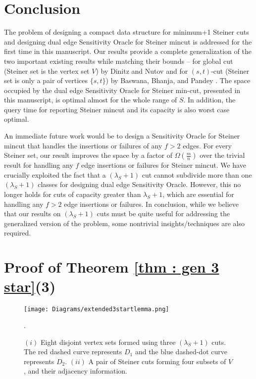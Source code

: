 \documentclass[letterpaper,11pt]{article}
\begin{document}
\section{Conclusion} \label{sec : conclusion}
The problem of designing a compact data structure for minimum+1 Steiner cuts and designing dual edge Sensitivity Oracle for Steiner mincut is addressed for the first time in this manuscript. Our results provide a complete generalization of the two important existing results while matching their bounds -- for global cut (Steiner set is the vertex set $V$) by Dinitz and Nutov \cite{DBLP:conf/stoc/DinitzN95} and for $(s,t)$-cut (Steiner set is only a pair of vertices $\{s,t\}$) by Baswana, Bhanja, and Pandey \cite{DBLP:journals/talg/BaswanaBP23}. The space occupied by the dual edge Sensitivity Oracle for Steiner min-cut, presented in this manuscript, is optimal almost for the whole range of $S$. In addition, the query time for reporting Steiner mincut and its capacity is also worst case optimal.

An immediate future work would be to design a Sensitivity Oracle for Steiner mincut that handles the insertions or failures of any $f>2$ edges. For every Steiner set, our result improves the space by a factor of $\Omega(\frac{m}{n})$ over the trivial result 
for handling any $f$ edge insertions or failures for Steiner mincut.
We have crucially exploited the fact that a $(\lambda_S+1)$ cut cannot subdivide more than one $(\lambda_S+1)$ classes for designing dual edge Sensitivity Oracle. However, this no longer holds for cuts of capacity greater than $\lambda_S+1$, which are essential for handling any $f>2$ edge insertions or failures. In conclusion, while we believe that our results on $(\lambda_S+1)$ cuts must be quite useful for addressing the generalized version of the problem, some nontrivial insights/techniques are also required.




\newpage
\appendix


\section{Proof of Theorem \ref{thm : gen 3 star}(3)} \label{app : gen 3 star extended}


  \begin{figure}
 \centering
    \texttt{[image: Diagrams/extended3startlemma.png]} 
   \caption{$(i)$ Eight disjoint vertex sets formed using three $(\lambda_S+1)$ cuts. The red dashed curve represents $D_1$ and the blue dashed-dot curve represents $D_2$. $(ii)$ A pair of Steiner cuts forming four subsets of $V$, and their adjacency information.} 
  \label{fig : extended gen 3 star}. 
\end{figure}
\end{document}
